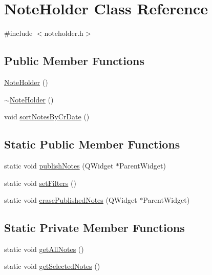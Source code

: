 \hypertarget{class_note_holder}{}\section{Note\+Holder Class Reference}
\label{class_note_holder}


{\ttfamily \#include $<$noteholder.\+h$>$}

\subsection*{Public Member Functions}
\begin{DoxyCompactItemize}
\item 
\hyperlink{class_note_holder_a8a6d0e272ccfe8f56534c646b8c5e92c}{Note\+Holder} ()
\item 
\hyperlink{class_note_holder_afaeb3c127fbbc30d03b69e2cb0f15f2a}{$\sim$\+Note\+Holder} ()
\item 
void \hyperlink{class_note_holder_a542006185a3eaf3e9b13fc0bfb01b2e7}{sort\+Notes\+By\+Cr\+Date} ()
\end{DoxyCompactItemize}
\subsection*{Static Public Member Functions}
\begin{DoxyCompactItemize}
\item 
static void \hyperlink{class_note_holder_abb4a2d19ddace4d652cfda5becd03302}{publish\+Notes} (Q\+Widget $\ast$Parent\+Widget)
\item 
static void \hyperlink{class_note_holder_a848b098c6649554c7dcc0605c90e8a24}{set\+Filters} ()
\item 
static void \hyperlink{class_note_holder_a4559ef4141f902ae5712052084c6187e}{erase\+Published\+Notes} (Q\+Widget $\ast$Parent\+Widget)
\end{DoxyCompactItemize}
\subsection*{Static Private Member Functions}
\begin{DoxyCompactItemize}
\item 
static void \hyperlink{class_note_holder_a53853f7b183e262eb165bdb3af8f3e45}{get\+All\+Notes} ()
\item 
static void \hyperlink{class_note_holder_ab4709f2b857351ba118201a159c5cd6c}{get\+Selected\+Notes} ()
\end{DoxyCompactItemize}
